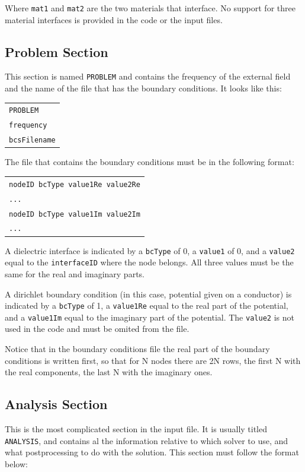 \documentclass[12pt]{article}
\begin{document}
Where \verb+mat1+ and \verb+mat2+ are the two materials that interface. No support for three material interfaces is provided in the code or the input files.

\subsection{Problem Section}
This section is named \verb+PROBLEM+ and contains the frequency of the external field and the name of the file that has the boundary conditions. It looks like this:

\begin{tabular}{l}
\texttt{PROBLEM}\\
\texttt{frequency}\\
\texttt{bcsFilename}
\end{tabular}

The file that contains the boundary conditions must be in the following format:

\begin{tabular}{l}
\texttt{nodeID bcType value1Re value2Re}\\
\texttt{...}\\
\texttt{nodeID bcType value1Im value2Im}\\
\texttt{...}
\end{tabular}

A dielectric interface is indicated by a \verb+bcType+ of 0, a \verb+value1+ of 0, and a \verb+value2+ equal to the \verb+interfaceID+ where the node belongs. All three values must be the same for the real and imaginary parts.

A dirichlet boundary condition (in this case, potential given on a conductor) is indicated by a \verb+bcType+ of 1, a \verb+value1Re+ equal to the real part of the potential, and a \verb+value1Im+ equal to the imaginary part of the potential. The \verb+value2+ is not used in the code and must be omited from the file.

Notice that in the boundary conditions file the real part of the boundary conditions is written first, so that for N nodes there are 2N rows, the first N with the real components, the last N with the imaginary ones.

\subsection{Analysis Section}
This is the most complicated section in the input file. It is usually titled \verb+ANALYSIS+, and contains al the information relative to which solver to use, and what postprocessing to do with the solution. This section must follow the format below:
\end{document}
